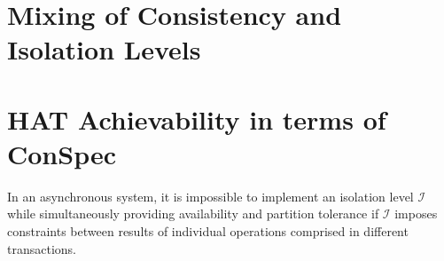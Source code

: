 \documentclass[acmlarge, ,11pt]{acmart}
\begin{document}

\section{Mixing of Consistency and Isolation Levels}\label{sec:mix}


\section{HAT Achievability in terms of ConSpec}\label{sec:cap}
In an asynchronous system, it is impossible to implement an isolation level $\mathcal{I}$ while simultaneously providing availability and partition tolerance if $\mathcal{I}$ imposes constraints between results of individual operations comprised in different transactions. 
\end{document}
